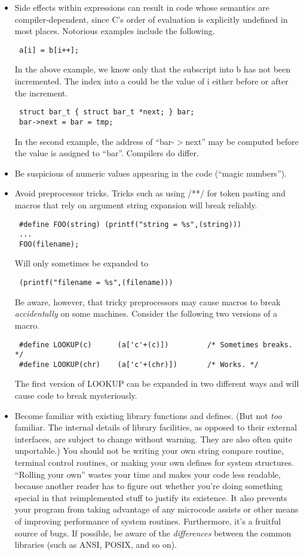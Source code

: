 \begin{itemize}
\item Side effects within expressions can result in code whose semantics are
compiler-dependent, since C's order of evaluation is explicitly undefined in
most places. Notorious  examples include the following. 
\begin{verbatim}
 a[i] = b[i++];
\end{verbatim}
In the above example, we know only that the subscript into b has not been
incremented.  The index into a could be the value of i either before or after
the increment. 
\begin{verbatim}
 struct bar_t { struct bar_t *next; } bar;  
 bar->next = bar = tmp; 
\end{verbatim}
In the second example, the address of ``bar-$>$next'' may be computed before the
value is assigned to ``bar''. Compilers do differ. 

\item Be suspicious of numeric values appearing in the code (``magic numbers'').

\item Avoid preprocessor tricks. Tricks such as using /**/ for token pasting and
macros that rely on argument string expansion will break reliably. 
\begin{verbatim}
 #define FOO(string) (printf("string = %s",(string)))  
 ...  
 FOO(filename); 
\end{verbatim}
Will only sometimes be expanded to 
\begin{verbatim}
 (printf("filename = %s",(filename))) 
\end{verbatim}
Be aware, however, that tricky preprocessors may cause macros to break
{\em accidentally} on  some machines. Consider the following two versions
of a macro.
\begin{verbatim}
 #define LOOKUP(c)      (a['c'+(c)])         /* Sometimes breaks. */
 #define LOOKUP(chr)    (a['c'+(chr)])       /* Works. */
\end{verbatim}
The first version of LOOKUP can be expanded in two different ways and will
cause code to break mysteriously. 

\item Become familiar with existing library functions and defines.
(But not {\em too} familiar. The internal details of library facilities,
as opposed to their external interfaces, are subject to change without
warning. They are also often quite unportable.) You should not be writing
your own string compare routine, terminal control routines, or making your
own defines for system structures. ``Rolling your own'' wastes your time
and makes your code less readable, because another reader has to figure
out whether you're doing something special in that reimplemented stuff to
justify its existence. It also prevents your program from taking advantage
of any microcode assists or other means of improving performance of system
routines. Furthermore, it's a fruitful source of bugs. If possible, be aware
of the {\em differences} between the
common libraries (such as ANSI, POSIX, and so on). 


\end{itemize}
